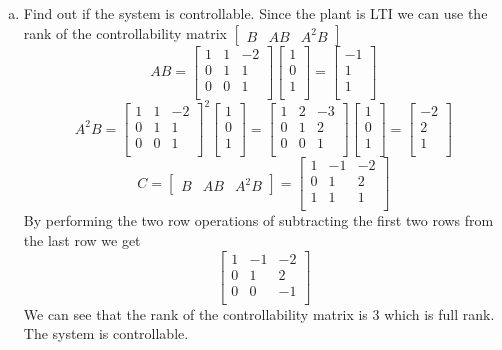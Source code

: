 \documentclass{article}
\begin{document}
\begin{enumerate}[a.]
\item Find out if the system is controllable.
\newline
Since the plant is LTI we can use the rank of the controllability matrix $\begin{bmatrix}B & AB & A^2B\end{bmatrix}$
$$
AB =
\begin{bmatrix}
1 & 1 & -2 \\
0 & 1 &  1 \\
0 & 0 &  1 \\
\end{bmatrix}
\begin{bmatrix}
1 \\
0 \\
1 \\
\end{bmatrix}
=
\begin{bmatrix}
-1 \\
 1 \\
 1 \\
\end{bmatrix}
$$
$$
A^2B =
\begin{bmatrix}
1 & 1 & -2 \\
0 & 1 &  1 \\
0 & 0 &  1 \\
\end{bmatrix}
^2
\begin{bmatrix}
1 \\
0 \\
1 \\
\end{bmatrix}
=
\begin{bmatrix}
1 & 2 & -3 \\
0 & 1 & 2 \\
0 & 0 & 1 \\
\end{bmatrix}
\begin{bmatrix}
1 \\
0 \\
1 \\
\end{bmatrix}
=
\begin{bmatrix}
-2 \\
2 \\
1 \\
\end{bmatrix}
$$
$$
C = \begin{bmatrix}B & AB & A^2B\end{bmatrix} =
\begin{bmatrix}
1 & -1 & -2 \\
0 & 1 & 2   \\
1 & 1 & 1   \\
\end{bmatrix}
$$
By performing the two row operations of subtracting the first two rows from the last row we get
$$
\begin{bmatrix}
1 & -1 & -2 \\
0 & 1 & 2   \\
0 & 0 & -1  \\
\end{bmatrix}
$$
We can see that the rank of the controllability matrix is 3 which is full rank. The system is controllable.


\end{enumerate}
\end{document}
